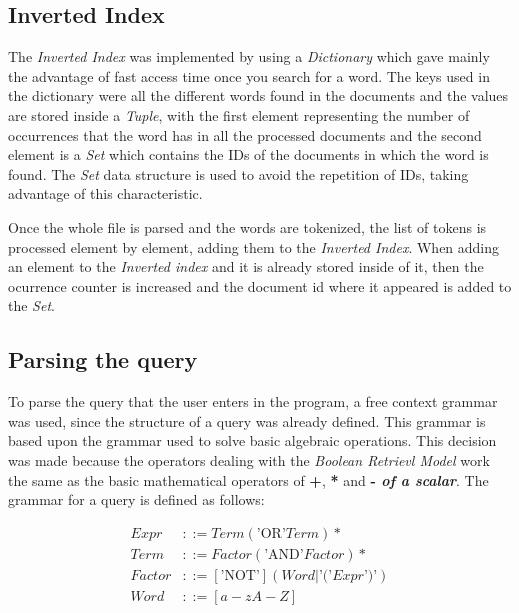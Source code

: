 \documentclass{article}
\begin{document}

\subsection{Inverted Index}

The \textit{Inverted Index} was implemented by using a \textit{Dictionary} which gave mainly the advantage of fast access time once you search for a word. The keys used in the dictionary were all the different words found in the documents and the values are stored inside a \textit{Tuple}, with the first element representing the number of occurrences that the word has in all the processed documents and the second element is a \textit{Set} which contains the IDs of the documents in which the word is found. The \textit{Set} data structure is used to avoid the repetition of IDs, taking advantage of this characteristic.

Once the whole file is parsed and the words are tokenized, the list of tokens is processed element by element, adding them to the \textit{Inverted Index}. When adding an element to the \textit{Inverted index} and it is already stored inside of it, then the ocurrence counter is increased and the document id where it appeared is added to the \textit{Set}.

\subsection{Parsing the query}

To parse the query that the user enters in the program, a free context grammar was used, since the structure of a query was already defined. This grammar is based upon the grammar used to solve basic algebraic operations. This decision was made because the operators dealing with the \textit{Boolean Retrievl Model} work the same as the basic mathematical operators of \textbf{+}, \textbf{*} and \textbf{- \textit{of a scalar}}. The grammar for a query is defined as follows:

\begin{align*}
	Expr   & ::= Term (\text{'OR'}  Term)*                          \\
	Term   & ::= Factor (\text{'AND'} Factor)*                      \\
	Factor & ::= [\text{'NOT'}] (Word | \text{'('} Expr \text{')'}) \\
	Word   & ::= [a-zA-Z]
\end{align*}
\end{document}

